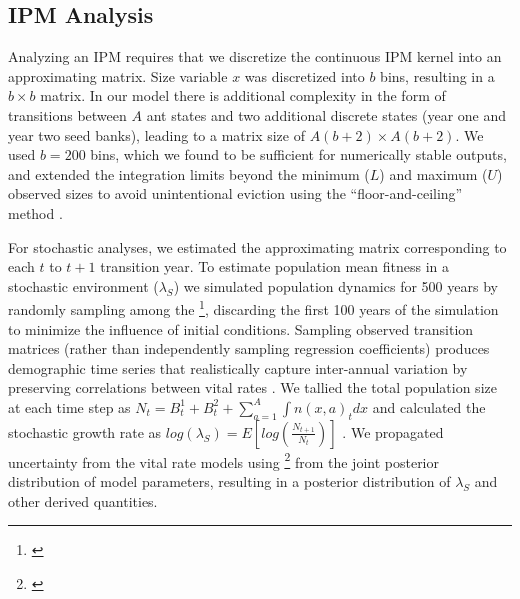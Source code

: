 \documentclass[11pt]{article}
\newcommand{\tom}[2]{{\color{red}{#1}}\footnote{\textit{\color{red}{#2}}}}
\begin{document}
\subsection*{IPM Analysis}
Analyzing an IPM requires that we discretize the continuous IPM kernel into an approximating matrix. 
Size variable $x$ was discretized into $b$ bins, resulting in a $b \times b$ matrix.
In our model there is additional complexity in the form of transitions between $A$ ant states and two additional discrete states (year one and year two seed banks), leading to a matrix size of $A(b+2) \times A(b+2)$.
We used $b = 200$ bins, which we found to be sufficient for numerically stable outputs, and extended the integration limits beyond the minimum ($L$) and maximum ($U$) observed sizes to avoid unintentional eviction using the ``floor-and-ceiling'' method \cite{Williams2012}. 

For stochastic analyses, we estimated the approximating matrix corresponding to each $t$ to $t+1$ transition year. 
To estimate population mean fitness in a stochastic environment ($\lambda_{S}$) we simulated population dynamics for 500 years by randomly sampling among the \tom{17 annual transition matrices}{Unless you add 2024 I think this is 16.}, discarding the first 100 years of the simulation to minimize the influence of initial conditions. 
Sampling observed transition matrices (rather than independently sampling regression coefficients) produces demographic time series that realistically capture inter-annual variation by preserving correlations between vital rates \cite{metcalf2015statistical}.
We tallied the total population size at each time step as  $N_{t} = B^1_{t} + B^2_{t} + \sum_{a=1}^{A}\int n(x,a)_{t}dx$ and calculated the stochastic growth rate as $log(\lambda_S) = E[log(\frac{N_{t+1}}{N_{t}})]$ \citep{Mark2009}.
We propagated uncertainty from the vital rate models using \tom{1000 draws}{I did not realize you were doing this many. I think you could use as few as 100, which would make your numerical work much faster.} from the joint posterior distribution of model parameters, resulting in a posterior distribution of $\lambda_{S}$ and other derived quantities.
\end{document}
